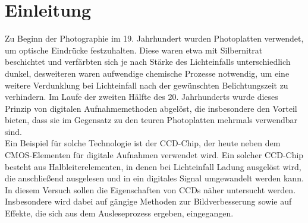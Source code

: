 \section{Einleitung}
Zu Beginn der Photographie im 19. Jahrhundert wurden Photoplatten verwendet, um optische Eindrücke festzuhalten. Diese waren etwa mit Silbernitrat beschichtet und verfärbten sich je nach Stärke des Lichteinfalls unterschiedlich dunkel, desweiteren waren aufwendige chemische Prozesse notwendig, um eine weitere Verdunklung bei Lichteinfall nach der gewünschten Belichtungszeit zu verhindern. Im Laufe der zweiten Hälfte des 20. Jahrhunderts wurde dieses Prinzip von digitalen Aufnahmemethoden abgelöst, die insbesondere den Vorteil bieten, dass sie im Gegensatz zu den teuren Photoplatten mehrmals verwendbar sind. \\
Ein Beispiel für solche Technologie ist der CCD-Chip, der heute neben dem CMOS-Elementen für digitale Aufnahmen verwendet wird. Ein solcher CCD-Chip besteht aus Halbleiterelementen, in denen bei Lichteinfall Ladung ausgelöst wird, die anschließend ausgelesen und in ein digitales Signal umgewandelt werden kann. \\
In diesem Versuch sollen die Eigenschaften von CCDs näher untersucht werden. Insbesondere wird dabei auf gängige Methoden zur Bildverbesserung sowie auf Effekte, die sich aus dem Ausleseprozess ergeben, eingegangen. 
